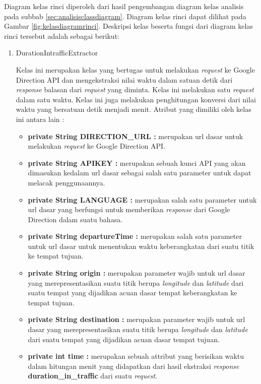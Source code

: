 Diagram kelas rinci diperoleh dari hasil pengembangan diagram kelas analisis pada subbab \ref{sec:analisisclassdiagram}. Diagram kelas rinci dapat dilihat pada Gambar \ref{fig:kelasdiagramrinci}. Deskripsi kelas beserta fungsi dari diagram kelas rinci tersebut adalah sebagai berikut:
\begin{enumerate}
	\item DurationIntrafficExtractor
	
	Kelas ini merupakan kelas yang bertugas untuk melakukan \textit{request} ke Google Direction API dan mengekstraksi nilai waktu dalam satuan detik dari \textit{response} balasan dari \textit{request} yang diminta. Kelas ini melakukan satu \textit{request} dalam satu waktu. Kelas ini juga melakukan penghitungan konversi dari nilai waktu yang bersatuan detik menjadi menit. Atribut yang dimiliki oleh kelas ini antara lain :
	
	\begin{itemize}
		\item \textbf{private String DIRECTION\_URL :} merupakan url dasar untuk melakukan \textit{request} ke Google Direction API.
		\item \textbf{private String APIKEY :} merupakan sebuah kunci API yang akan dimasukan kedalam url dasar sebagai salah satu parameter untuk dapat melacak penggunaannya.
		\item \textbf{private String LANGUAGE :} merupakan salah satu parameter untuk url dasar yang berfungsi untuk memberikan \textit{response} dari Google Direction dalam suatu bahasa.
		\item \textbf{private String departureTime :} merupakan salah satu parameter untuk url dasar untuk menentukan waktu keberangkatan dari suatu titik ke tempat tujuan.
		\item \textbf{private String origin :} merupakan parameter wajib untuk url dasar yang merepresentasikan suatu titik berupa \textit{longitude} dan \textit{latitude} dari suatu tempat yang dijadikan acuan dasar tempat keberangkatan ke tempat tujuan.
		\item \textbf{private String destination :} merupakan parameter wajib untuk url dasar yang merepresentasikan suatu titik berupa \textit{longitude} dan \textit{latitude} dari suatu tempat yang dijadikan acuan dasar tempat tujuan.
		\item \textbf{private int time :} merupakan sebuah attribut yang berisikan waktu dalam hitungan menit yang didapatkan dari hasil ekstraksi \textit{response} \textbf{duration\_in\_traffic} dari suatu \textit{request}. 
	\end{itemize}
	

\end{enumerate}
